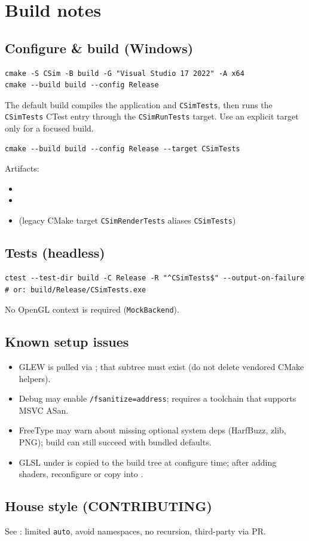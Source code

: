 \section{Build notes}
\label{sec:build}

\subsection{Configure \& build (Windows)}
\begin{lstlisting}[language={}]
cmake -S CSim -B build -G "Visual Studio 17 2022" -A x64
cmake --build build --config Release
\end{lstlisting}

The default build compiles the application and \texttt{CSimTests}, then runs
the \texttt{CSimTests} CTest entry through the \texttt{CSimRunTests} target.
Use an explicit target only for a focused build.

\begin{lstlisting}[language={}]
cmake --build build --config Release --target CSimTests
\end{lstlisting}

Artifacts:
\begin{itemize}
  \item {}
  \item {}
  \item {} (legacy CMake target
        \texttt{CSimRenderTests} aliases \texttt{CSimTests})
\end{itemize}

\subsection{Tests (headless)}
\begin{lstlisting}[language={}]
ctest --test-dir build -C Release -R "^CSimTests$" --output-on-failure
# or: build/Release/CSimTests.exe
\end{lstlisting}
No OpenGL context is required (\texttt{MockBackend}).

\subsection{Known setup issues}
\begin{itemize}
  \item GLEW is pulled via ; that
        subtree must exist (do not delete vendored CMake helpers).
  \item Debug may enable \texttt{/fsanitize=address}; requires a toolchain that
        supports MSVC ASan.
  \item FreeType may warn about missing optional system deps (HarfBuzz, zlib,
        PNG); build can still succeed with bundled defaults.
  \item GLSL under  is copied to the build tree at
        configure time; after adding shaders, reconfigure or copy into
        .
\end{itemize}

\subsection{House style (CONTRIBUTING)}
See : limited \texttt{auto}, avoid namespaces,
no recursion, third-party via PR.
